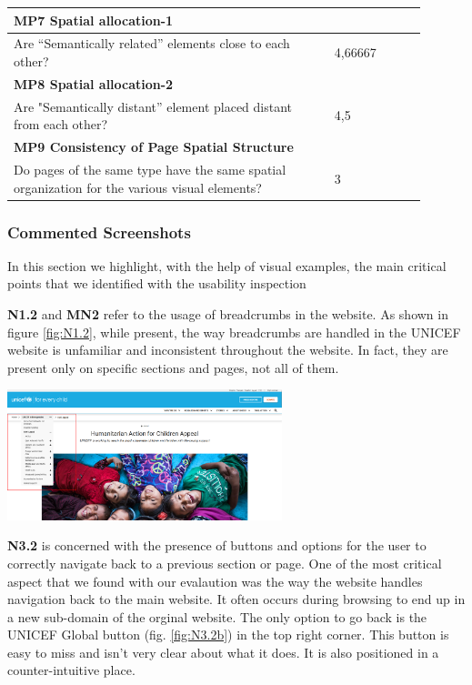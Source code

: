 \begin{longtable}{|p{0.7\linewidth}|p{0.2\linewidth}|}
\multicolumn{2}{|l|}{\textbf{MP7 Spatial allocation-1}} \\
\hline
Are “Semantically related” elements close to each other? & 4,66667  \\
\hline

\multicolumn{2}{|l|}{\textbf{MP8 Spatial allocation-2}} \\
\hline
Are "Semantically distant” element placed distant from each other? & 4,5  \\
\hline

\multicolumn{2}{|l|}{\textbf{MP9 Consistency of Page Spatial Structure}} \\
\hline
Do pages of the same type have the same spatial organization for the various visual elements? & 3  \\
\hline

\end{longtable}

\subsubsection{Commented Screenshots}
In this section we highlight, with the help of visual examples, the main critical points that we identified with the usability inspection

\textbf{N1.2} and \textbf{MN2} refer to the usage of breadcrumbs in the website. As shown in figure \ref{fig:N1.2}, while present, the way breadcrumbs are handled in the UNICEF website is unfamiliar and
inconsistent throughout the website. In fact, they are present only on specific sections and pages, not all of them.

\begin{center}
    \includegraphics[width=0.6\textwidth]{img/critical_heuristics/MN2.png}
\end{center}

\vspace{1em}

\textbf{N3.2} is concerned with the presence of buttons and options for the user to correctly navigate back to a previous section or page. One of the most critical aspect that we found with our evalaution was the way
the website handles navigation back to the main website. It often occurs during browsing to end up in a new sub-domain of the orginal website. The only option to go back is the UNICEF Global button (fig. \ref{fig:N3.2b}) in the top right corner.
This button is easy to miss and isn't very clear about what it does. It is also positioned in a counter-intuitive place.


